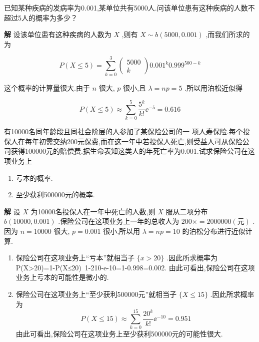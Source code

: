 \begin{example}
	已知某种疾病的发病率为0.001,某单位共有5000人.问该单位患有这种疾病的人数不超过5人的概率为多少？
	
	\textbf{解} 设该单位患有这种疾病的人数为 $ X $ ,则有 $ X\sim b(5000,0.001) $ ,而我们所求的为
	
	\[
	P(X \leqslant 5)=\sum_{k=0}^{3} \left( \begin{array}{c}{5000} \\ {k}\end{array}\right) 0.001^{k} 0.999^{500-k}
	\]
	
	这个概率的计算量很大.由于 $ n $ 很大, $ p $ 很小,且 $ \lambda=n p=5 $ .所以用泊松近似得
	
	\[
	P(X \leqslant 5) \approx \sum_{k=0}^{5} \frac{5^{k}}{k !} \ee ^{-5}=0.616
	\]
	
\end{example}

\begin{example}
	有10000名同年龄段且同社会阶层的人参加了某保险公司的一
	项人寿保险.每个投保人在每年初需交纳200元保费,而在这一年中若投保人死亡,则受益人可从保险公司获得100000元的赔偿费.据生命表知这类人的年死亡率为0.001.试求保险公司在这项业务上
	
	\begin{enumerate}
		\item 亏本的概率.
		\item 至少获利500000元的概率.
	\end{enumerate}
	
	\textbf{解} 设 $ X $ 为10000名投保人在一年中死亡的人数,则 $ X $ 服从二项分布 $ b(10000,0.001) $ .保险公司在这项业务上一年的总收人为 $ 200\times = 2000000(\text{元}) $ .因为 $ n=10000 $ 很大, $ p=0.001 $ 很小,所以用 $ \lambda =np=10 $ 的泊松分布进行近似计算.
	
	\begin{enumerate}
		\item 保险公司在这项业务上“亏本”就相当子 $ \{x>20\} $ .因此所求概率为P(X>20)=1-P(X≤20)~1-210-e-10=1-0.998=0.002.
		由此可看出,保险公司在这项业务上亏本的可能性是微小的.
		\item 保险公司在这项业务上“至少获利500000元”就相当子 $ \{X \leqslant 15\} $ .因此所求概率为
		\[
		P(X \leqslant 15) \approx \sum_{k=0}^{15} \frac{20^{k}}{k !} \ee ^{-10}=0.951
		\]
		由此可看出,保险公司在这项业务上至少获利500000元的可能性很大.
	\end{enumerate}
\end{example}


